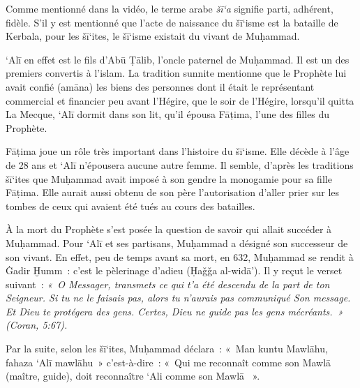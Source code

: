 
Comme mentionné dans la vidéo, le terme arabe \emph{šī`a} signifie
parti, adhérent, fidèle. S'il y est mentionné que l'acte de naissance du
šī`isme est la bataille de Kerbala, pour les šī`ites, le šī`isme
existait du vivant de Muḥammad.

`Alī en effet est le fils d'Abū Ṭālib, l'oncle paternel de Muḥammad. Il
est un des premiers convertis à l'islam. La tradition sunnite mentionne
que le Prophète lui avait confié (amāna) les biens des personnes dont il
était le représentant commercial et financier peu avant l'Hégire, que le
soir de l'Hégire, lorsqu'il quitta La Mecque, `Alī dormit dans son lit,
qu'il épousa Fāṭima, l'une des filles du Prophète.

Fāṭima joue un rôle très important dans l'histoire du šī`isme. Elle
décède à l'âge de 28 ans et `Alī n'épousera aucune autre femme. Il
semble, d'après les traditions šī`ites que Muḥammad avait imposé à son
gendre la monogamie pour sa fille Fāṭima. Elle aurait aussi obtenu de
son père l'autorisation d'aller prier sur les tombes de ceux qui avaient
été tués au cours des batailles.

À la mort du Prophète s'est posée la question de savoir qui allait
succéder à Muḥammad. Pour `Alī et ses partisans, Muḥammad a désigné son
successeur de son vivant. En effet, peu de temps avant sa mort, en 632,
Muḥammad se rendit à Ġadir Ḫumm~: c'est le pèlerinage d'adieu (Ḥaǧǧa
al-widā'). Il y reçut le verset suivant~: \emph{«~O Messager, transmets
ce qui t'a été descendu de la part de ton Seigneur. Si tu ne le faisais
pas, alors tu n'aurais pas communiqué Son message. Et Dieu te protégera
des gens. Certes, Dieu ne guide pas les gens mécréants.~» (Coran,
5:67).}

Par la suite, selon les šī`ites, Muḥammad déclara~: «~Man kuntu Mawlāhu,
fahaza `Alī mawlāhu~» c'est-à-dire~: «~Qui me reconnaît comme son Mawlā
(maître, guide), doit reconnaître `Ali comme son Mawlā ~».



